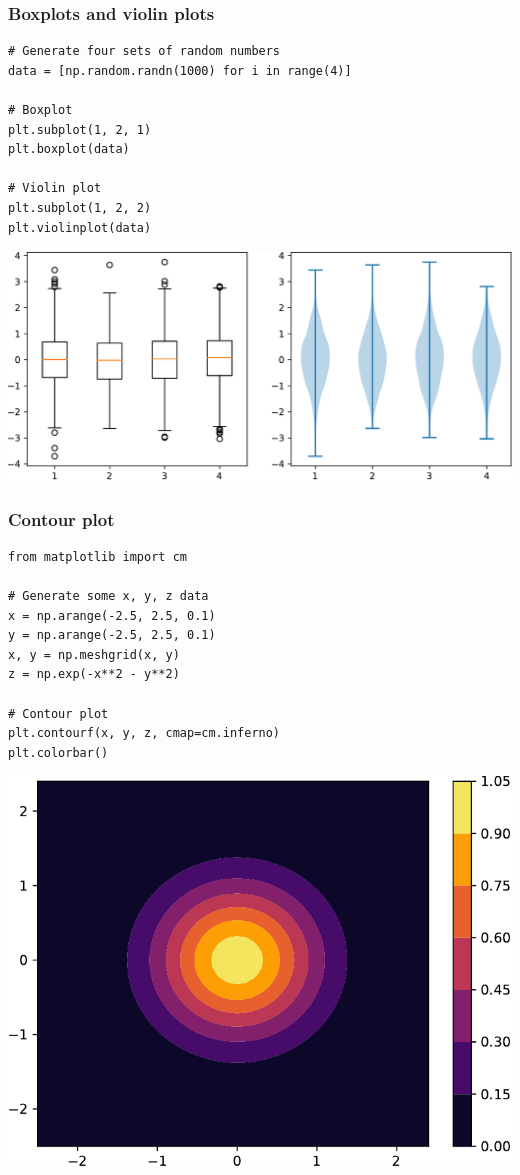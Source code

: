 \documentclass[xcolor=table]{beamer}
\begin{document}
\begin{frame}[fragile]
\frametitle{Boxplots and violin plots}

\begin{lstlisting}[style=python]
# Generate four sets of random numbers
data = [np.random.randn(1000) for i in range(4)]

# Boxplot
plt.subplot(1, 2, 1)
plt.boxplot(data)

# Violin plot
plt.subplot(1, 2, 2)
plt.violinplot(data)
\end{lstlisting}

\vspace{-0.6cm}
\begin{center}
	\includegraphics[width=.72\textwidth]{plot4.pdf}
\end{center}

\end{frame}

\begin{frame}[fragile]
\frametitle{Contour plot}

\tiny
\begin{lstlisting}[style=python]
from matplotlib import cm

# Generate some x, y, z data
x = np.arange(-2.5, 2.5, 0.1)
y = np.arange(-2.5, 2.5, 0.1)
x, y = np.meshgrid(x, y)
z = np.exp(-x**2 - y**2)

# Contour plot
plt.contourf(x, y, z, cmap=cm.inferno)
plt.colorbar()
\end{lstlisting}

\vspace{-0.8cm}
\begin{center}
	\includegraphics[width=.42\textwidth]{plot5.pdf}
\end{center}

\end{frame}
\end{document}
